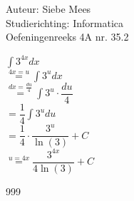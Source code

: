 \documentclass[a4paper]{article}
\begin{document}
  
\noindent \large Auteur: Siebe Mees \\
\noindent \large Studierichting: Informatica\\
\noindent \large Oefeningenreeks 4A nr. 35.2\\

\medskip

\normalsize

$\displaystyle\int 3^{4x} dx $\\

$ \overset{4x = u}{=} \displaystyle\int 3^u dx $\\

$ \overset{dx = \tfrac{du}{4}}{=} \displaystyle\int 3^u \cdot \dfrac{du}{4} $\\

$ = \dfrac{1}{4} \displaystyle\int 3^u du $\\

$ = \dfrac{1}{4} \cdot \dfrac{3^u}{\ln(3)} + C $\\

$ \overset{u = 4x}{=} \dfrac{3^{4x}}{4 \ln(3)} + C $\\

\begin{thebibliography}{999}
\end{thebibliography}
\end{document}
